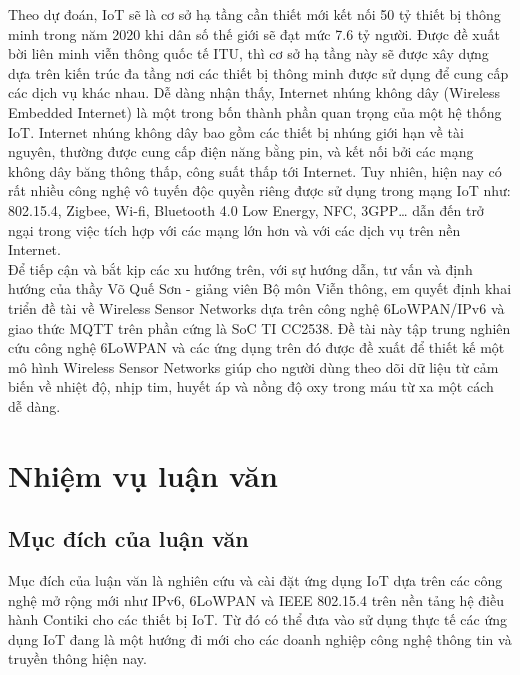 \documentclass{report}
\begin{document}
Theo dự đoán, IoT sẽ là cơ sở hạ tầng cần thiết mới kết nối 50 tỷ thiết bị thông minh
trong năm 2020 khi dân số thế giới sẽ đạt mức 7.6 tỷ người. Được đề xuất bời liên
minh viễn thông quốc tế ITU, thì cơ sở hạ tầng này sẽ được xây dựng dựa trên kiến
trúc đa tầng nơi các thiết bị thông minh được sử dụng để cung cấp các dịch vụ khác
nhau. Dễ dàng nhận thấy, Internet nhúng không dây (Wireless Embedded Internet)
là một trong bốn thành phần quan trọng của một hệ thống IoT. Internet nhúng
không dây bao gồm các thiết bị nhúng giới hạn về tài nguyên, thường được cung
cấp điện năng bằng pin, và kết nối bởi các mạng không dây băng thông thấp, công
suất thấp tới Internet. Tuy nhiên, hiện nay có rất nhiều công nghệ vô tuyến độc quyền riêng được sử dụng
trong mạng IoT như: 802.15.4, Zigbee, Wi-fi, Bluetooth 4.0 Low Energy, NFC,
3GPP… dẫn đến trở ngại trong việc tích hợp với các mạng lớn hơn và với các dịch vụ trên nền Internet. \\

Để tiếp cận và bắt kịp các xu hướng trên, với sự hướng dẫn, tư vấn và định hướng của
thầy Võ Quế Sơn - giảng viên Bộ môn Viễn thông, em quyết định khai triển đề tài về Wireless
Sensor Networks dựa trên công nghệ 6LoWPAN/IPv6 và giao thức MQTT trên phần cứng là SoC TI
CC2538. Đề tài này tập trung nghiên cứu công nghệ 6LoWPAN và các ứng dụng trên đó được đề xuất để thiết kế một mô hình Wireless Sensor Networks giúp cho người dùng theo dõi dữ liệu từ cảm biến về nhiệt độ, nhịp tim, huyết áp và nồng độ oxy trong máu từ xa một cách dễ dàng.

\section{Nhiệm vụ luận văn}
\subsection{Mục đích của luận văn}
Mục đích của luận văn là nghiên cứu và cài đặt ứng dụng IoT dựa trên các công
nghệ mở rộng mới như IPv6, 6LoWPAN và IEEE 802.15.4
trên nền tảng hệ điều hành Contiki cho các thiết bị IoT. Từ đó có thể đưa vào sử
dụng thực tế các ứng dụng IoT đang là một hướng đi mới cho các doanh nghiệp
công nghệ thông tin và truyền thông hiện nay.
\end{document}
